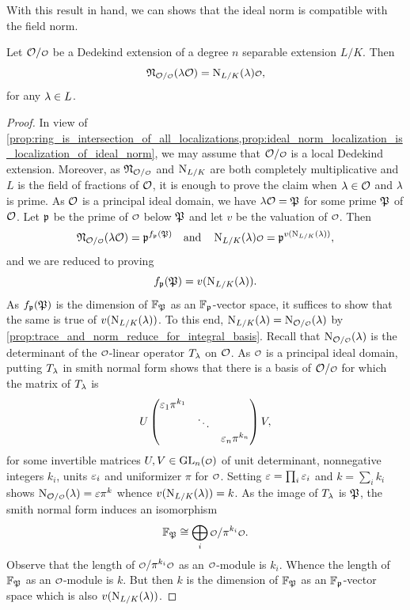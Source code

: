     With this result in hand, we can shows that the ideal norm is compatible with the field norm.

    \begin{proposition}\label{prop:ideal_norm_of_principal_ideal}
      Let \(\mc{O}/\smc{O}\) be a Dedekind extension of a degree \(n\) separable extension \(L/K\). Then
      \[
        \mf{N}_{\mc{O}/\smc{O}}(\l\mc{O}) = \Norm_{L/K}(\l)\smc{O},
      \]
      for any \(\lambda \in L\).
    \end{proposition}
    \begin{proof}
      In view of \cref{prop:ring_is_intersection_of_all_localizations,prop:ideal_norm_localization_is_localization_of_ideal_norm}, we may assume that \(\mc{O}/\smc{O}\) is a local Dedekind extension. Moreover, as \(\mf{N}_{\mc{O}/\smc{O}}\) and \(\operatorname{\mathrm{N}}_{L/K}\) are both completely multiplicative and \(L\) is the field of fractions of \(\mathcal{O}\), it is enough to prove the claim when \(\lambda \in \mathcal{O}\) and \(\lambda\) is prime. As \(\mathcal{O}\) is a principal ideal domain, we have \(\lambda\mathcal{O} = \mathfrak{P}\) for some prime \(\mathfrak{P}\) of \(\mathcal{O}\). Let \(\mathfrak{p}\) be the prime of \(\smc{O}\) below \(\mathfrak{P}\) and let \(v\) be the valuation of \(\smc{O}\). Then
      \[
        \mf{N}_{\mc{O}/\smc{O}}(\l\mc{O}) = \mf{p}^{f_{\mf{p}}(\mf{P})} \quad \text{and} \quad \Norm_{L/K}(\l)\smc{O} = \mf{p}^{v(\Norm_{L/K}(\l))},
      \]
      and we are reduced to proving
      \[
        f_{\mathfrak{p}}(\mathfrak{P}) = v(\operatorname{\mathrm{N}}_{L/K}(\lambda)).
      \]
      As \(f_{\mathfrak{p}}(\mathfrak{P})\) is the dimension of \(\mathbb{F}_{\mathfrak{P}}\) as an \(\mathbb{F}_{\mathfrak{p}}\)-vector space, it suffices to show that the same is true of \(v(\operatorname{\mathrm{N}}_{L/K}(\lambda))\). To this end, \(\Norm_{L/K}(\l) = \Norm_{\mc{O}/\smc{O}}(\l)\) by \cref{prop:trace_and_norm_reduce_for_integral_basis}. Recall that \(\Norm_{\mc{O}/\smc{O}}(\l)\) is the determinant of the \(\smc{O}\)-linear operator \(T_{\lambda}\) on \(\mathcal{O}\). As \(\smc{O}\) is a principal ideal domain, putting \(T_{\lambda}\) in smith normal form shows that there is a basis of \(\mc{O}/\smc{O}\) for which the matrix of \(T_{\lambda}\) is
      \[
        U\begin{pmatrix} \varepsilon_{1}\pi^{k_{1}} & & \\ & \ddots & \\ & & \varepsilon_{n}\pi^{k_{n}} \end{pmatrix}V,
      \]
      for some invertible matrices \(U,V \in \GL_{n}(\smc{O})\) of unit determinant, nonnegative integers \(k_{i}\), units \(\varepsilon_{i}\) and uniformizer \(\pi\) for \(\smc{O}\). Setting \(\varepsilon = \prod_{i}\varepsilon_{i}\) and \(k = \sum_{i}k_{i}\) shows \(\Norm_{\mc{O}/\smc{O}}(\l) =\e\pi^{k}\) whence \(v(\operatorname{\mathrm{N}}_{L/K}(\lambda)) = k\). As the image of \(T_{\lambda}\) is \(\mathfrak{P}\), the smith normal form induces an isomorphism
      \[
        \F_{\mf{P}} \cong \bigop_{i}\smc{O}/\pi^{k_{i}}\smc{O}.
      \]
      Observe that the length of \(\smc{O}/\pi^{k_{i}}\smc{O}\) as an \(\smc{O}\)-module is \(k_{i}\). Whence the length of \(\mathbb{F}_{\mathfrak{P}}\) as an \(\smc{O}\)-module is \(k\). But then \(k\) is the dimension of \(\mathbb{F}_{\mathfrak{P}}\) as an \(\mathbb{F}_{\mathfrak{p}}\)-vector space which is also \(v(\operatorname{\mathrm{N}}_{L/K}(\lambda))\).
    \end{proof}

